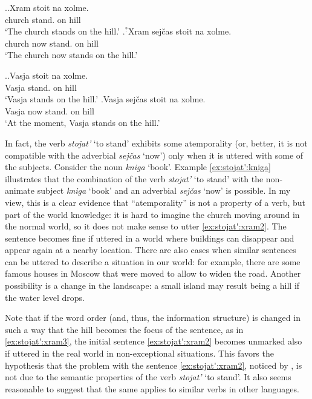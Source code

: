 \ex.\label{ex:stojat':xram}\ag.Xram stoit na xolme.\\
church stand. on hill\\
\trans `The church stands on the hill.'
\bg.\label{ex:stojat':xram2}$^?$Xram sej\v{c}as stoit na xolme.\\
church now stand. on hill\\
\trans `The church now stands on the hill.'

\ex.\label{ex:stojat':Vasja}\ag.Vasja stoit na xolme.\\
Vasja stand. on hill\\
\trans `Vasja stands on the hill.'
\bg.Vasja sej\v{c}as stoit na xolme.\\
Vasja now stand. on hill\\
\trans `At the moment, Vasja stands on the hill.'

In fact, the verb \textit{stojat'} `to stand' exhibits some atemporality (or, better, it is not compatible with the adverbial \textit{sej\v{c}as} `now') only when it is uttered with some of the subjects. Consider the noun \textit{kniga} `book'. Example \ref{ex:stojat':kniga} illustrates that the combination of the verb \textit{stojat'} `to stand' with the non-animate subject \textit{kniga} `book' and an adverbial \textit{sej\v{c}as} `now' is possible.  In my view, this is a clear evidence that ``atemporality'' is not a property of a verb, but part of the world knowledge: it is hard to imagine the church moving around in the normal world, so it does not make sense to utter \ref{ex:stojat':xram2}. The sentence becomes fine if uttered in a world where buildings can disappear and appear again at a nearby location. There are also cases when similar sentences can be uttered to describe a situation in our world: for example, there are some famous houses in Moscow that were moved to allow to widen the road. Another possibility is a change in the landscape: a small island may result being a hill if the water level drops. 

Note that if the word order (and, thus, the information structure) is changed in such a way that the hill becomes the focus of the sentence, as in \ref{ex:stojat':xram3}, the initial sentence \ref{ex:stojat':xram2} becomes unmarked also if uttered in the real world in non-exceptional situations. This favors the hypothesis that the problem with the sentence \ref{ex:stojat':xram2}, noticed by \citet{Paducheva:96}, is not due to the semantic properties of the verb \textit{stojat'} `to stand'. It also seems reasonable to suggest that the same applies to similar verbs in other languages. 

